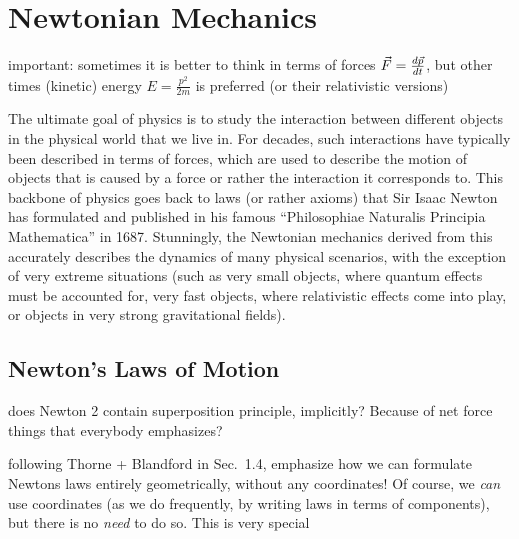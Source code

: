\documentclass[../class_mech_main.tex]{subfiles}
\begin{document}
\chapter{Newtonian Mechanics}


important: sometimes it is better to think in terms of forces $\vec{F} = \dv{\vec{p}}{t}$, but other times (kinetic) energy $E = \frac{p^2}{2m}$ is preferred (or their relativistic versions)


The ultimate goal of physics is to study the interaction between different objects in the physical world that we live in. For decades, such interactions have typically been described in terms of forces, which are used to describe the motion of objects that is caused by a force or rather the interaction it corresponds to. This backbone of physics goes back to laws (or rather axioms) that Sir Isaac Newton has formulated and published in his famous \enquote{Philosophiae Naturalis Principia Mathematica} in 1687. Stunningly, the Newtonian mechanics derived from this accurately describes the dynamics of many physical scenarios, with the exception of very extreme situations (such as very small objects, where quantum effects must be accounted for, very fast objects, where relativistic effects come into play, or objects in very strong gravitational fields). 



\newpage



    \section{Newton's Laws of Motion}





does Newton 2 contain superposition principle, implicitly? Because of net force things that everybody emphasizes?


following Thorne + Blandford in Sec.~1.4, emphasize how we can formulate Newtons laws entirely geometrically, without any coordinates! Of course, we \emph{can} use coordinates (as we do frequently, by writing laws in terms of components), but there is no \emph{need} to do so. This is very special



\end{document}
